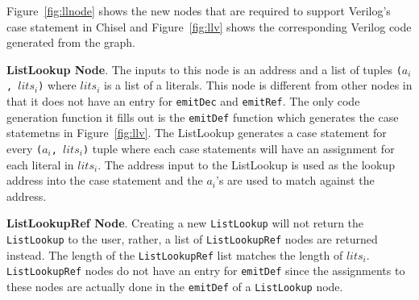 Figure~\ref{fig:llnode} shows the new nodes that are required to
support Verilog's case statement in Chisel and Figure~\ref{fig:llv}
shows the corresponding Verilog code generated from the graph. 

\textbf{ListLookup Node}. The inputs to this node is an address and a
list of tuples {\tt ($a_i$, $lits_i$)} where {\tt $lits_i$} is a list
of a literals. This node is different from other nodes in that it does
not have an entry for {\tt emitDec} and {\tt emitRef}. The only code
generation function it fills out is the {\tt emitDef} function which
generates the case statemetns in Figure~\ref{fig:llv}. The ListLookup
generates a case statement for every {\tt ($a_i$, $lits_i$)} tuple
where each case statements will have an assignment for each literal in
{\tt $lits_i$}. The address input to the ListLookup is used as the
lookup address into the case statement and the {\tt $a_i$}'s are used
to match against the address.

\textbf{ListLookupRef Node}. Creating a new {\tt ListLookup} will not return
the {\tt ListLookup} to the user, rather, a list of 
{\tt ListLookupRef} nodes are returned instead. The length of the 
{\tt ListLookupRef} list matches the length of {\tt $lits_i$}. 
{\tt ListLookupRef} nodes do not have an entry for {\tt emitDef} since
the assignments to these nodes are actually done in the {\tt emitDef}
of a {\tt ListLookup} node.


